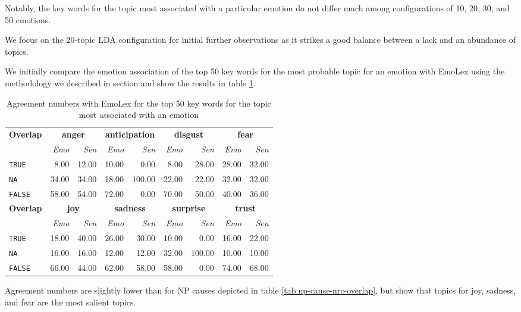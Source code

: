 Notably, the key words for the topic most associated with a particular emotion do not differ much among configurations of 10, 20, 30, and 50 emotions. 

We focus on the 20-topic LDA configuration for initial further observations as it strikes a good balance between a lack and an abundance of topics.

We initially compare the emotion association of the top 50 key words for the most probable topic for an emotion with EmoLex using the methodology we described in section \label{sec:emolex-evaluation} and show the results in table \ref{tab:topics-emolex}.

\begin{table}[]
\centering
\begin{tabular}{l|rr|rr|rr|rr}
{\bf Overlap} & \multicolumn{2}{c}{{\bf anger}} & \multicolumn{2}{c}{{\bf anticipation}} & \multicolumn{2}{c}{{\bf disgust}} & \multicolumn{2}{c}{{\bf fear}} \\
 & {\it Emo} & {\it Sen} & {\it Emo} & {\it Sen} & {\it Emo} & {\it Sen} & {\it Emo} & {\it Sen} \\\hline
\texttt{TRUE} & 8.00 & 12.00 & 10.00 & 0.00 & 8.00 & 28.00 & 28.00 & 32.00 \\
\texttt{NA} & 34.00 & 34.00 & 18.00 & 100.00 & 22.00 & 22.00 & 32.00 & 32.00 \\
\texttt{FALSE} & 58.00 & 54.00 & 72.00 & 0.00 & 70.00 & 50.00 & 40.00 & 36.00 \\\hline
{\bf Overlap} & \multicolumn{2}{c}{{\bf joy}} & \multicolumn{2}{c}{{\bf sadness}} & \multicolumn{2}{c}{{\bf surprise}} & \multicolumn{2}{c}{{\bf trust}} \\
 & {\it Emo} & {\it Sen} & {\it Emo} & {\it Sen} & {\it Emo} & {\it Sen} & {\it Emo} & {\it Sen} \\\hline
\texttt{TRUE} & 18.00 & 40.00 & 26.00 & 30.00 & 10.00 & 0.00 & 16.00 & 22.00 \\
\texttt{NA} & 16.00 & 16.00 & 12.00 & 12.00 & 32.00 & 100.00 & 10.00 & 10.00 \\
\texttt{FALSE} & 66.00 & 44.00 & 62.00 & 58.00 & 58.00 & 0.00 & 74.00 & 68.00
\end{tabular}
\caption{Agreement numbers with EmoLex for the top 50 key words for the topic most associated with an emotion}
\label{tab:topics-emolex}
\end{table}

Agreement numbers are slightly lower than for NP causes depicted in table \ref{tab:np-cause-nrc-overlap}, but show that topics for joy, sadness, and fear are the most salient topics.

